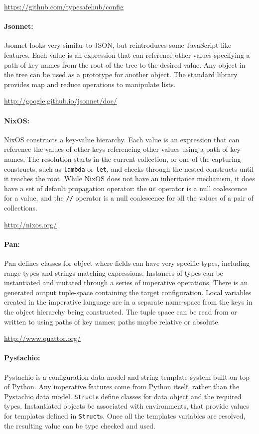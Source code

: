 \documentclass[letterpaper,twocolumn,10pt]{article}
\begin{document}
\noindent \url{https://github.com/typesafehub/config}

\paragraph{Jsonnet:}
Jsonnet looks very similar to JSON, but reintroduces some JavaScript-like features. Each value is an expression that can reference other values specifying a path of key names from the root of the tree to the desired value. Any object in the tree can be used as a prototype for another object. The standard library provides map and reduce operations to manipulate lists.

\noindent \url{http://google.github.io/jsonnet/doc/}

\paragraph{NixOS:}
NixOS constructs a key-value hierarchy. Each value is an expression that can reference the values of other keys referencing other values using a path of key names. The resolution starts in the current collection, or one of the capturing constructs, such as \texttt{lambda} or \texttt{let}, and checks through the nested constructs until it reaches the root. While NixOS does not have an inheritance mechanism, it does have a set of default propagation operator: the \texttt{or} operator is a null coalescence for a value, and the \texttt{//} operator is a null coalescence for all the values of a pair of collections.

\noindent\url{http://nixos.org/}

\paragraph{Pan:}
Pan defines classes for object where fields can have very specific types, including range types and strings matching expressions. Instances of types can be instantiated and mutated through a series of imperative operations. There is an generated output tuple-space containing the target configuration. Local variables created in the imperative language are in a separate name-space from the keys in the object hierarchy being constructed. The tuple space can be read from or written to using paths of key names; paths maybe relative or absolute.

\noindent \url{http://www.quattor.org/}

\paragraph{Pystachio:}
Pystachio is a configuration data model and string template system built on top of Python. Any imperative features come from Python itself, rather than the Pystachio data model. \texttt{Struct}s define classes for data object and the required types. Instantiated objects be associated with environments, that provide values for templates defined in \texttt{Struct}s. Once all the templates variables are resolved, the resulting value can be type checked and used.
\end{document}
